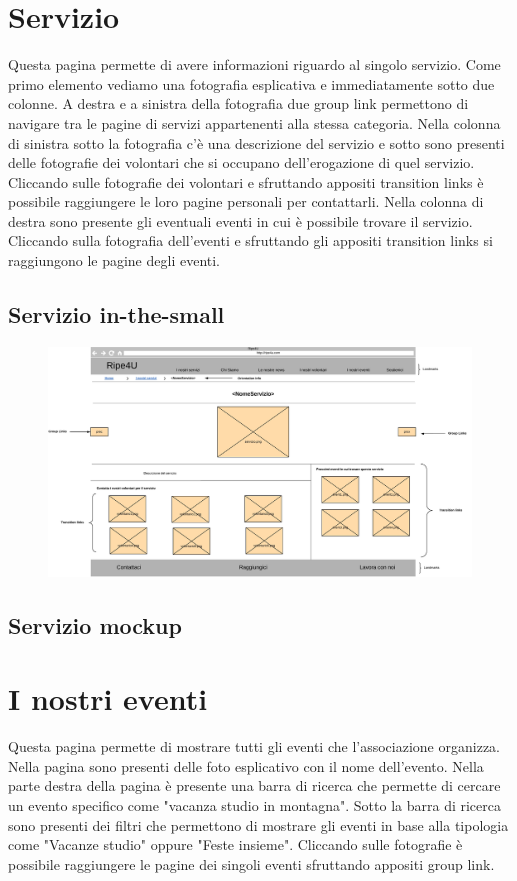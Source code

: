     \section{Servizio}    
    Questa pagina permette di avere informazioni riguardo al singolo servizio.
    Come primo elemento vediamo una fotografia esplicativa e immediatamente
    sotto due colonne. A destra e a sinistra della fotografia due group link
    permettono di navigare tra le pagine di servizi appartenenti alla stessa
    categoria. Nella colonna di sinistra sotto la fotografia c'è una descrizione
    del servizio e sotto sono presenti delle fotografie dei volontari che si
    occupano dell'erogazione di quel servizio. Cliccando sulle fotografie dei
    volontari e sfruttando appositi transition links è possibile raggiungere le
    loro pagine personali per contattarli. Nella colonna di destra sono presente
    gli eventuali eventi in cui è possibile trovare il servizio. Cliccando sulla
    fotografia dell'eventi e sfruttando gli appositi transition links si
    raggiungono le pagine degli eventi.

        \subsection{Servizio in-the-small}
        \begin{figure}[H]
            \centering
            \includegraphics[scale=0.37]{resources/images/servizio-in-the-small.jpg}
        \end{figure}

        \subsection{Servizio mockup}

    \section{I nostri eventi}
    Questa pagina permette di mostrare tutti gli eventi che l'associazione
    organizza. Nella pagina sono presenti delle foto esplicativo con il nome
    dell'evento. Nella parte destra della pagina è presente una barra di ricerca
    che permette di cercare un evento specifico come "vacanza studio in
    montagna". Sotto la barra di ricerca sono presenti dei filtri che permettono
    di mostrare gli eventi in base alla tipologia come "Vacanze studio" oppure
    "Feste insieme". Cliccando sulle fotografie è possibile raggiungere le
    pagine dei singoli eventi sfruttando appositi group link.

